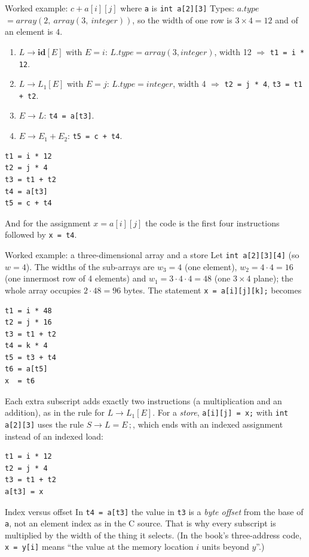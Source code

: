 \documentclass[11pt,a4paper]{article}
\newcommand{\at}[2]{\ensuremath{#1.\mathit{#2}}}
\begin{document}
\begin{examplebox}{Worked example: $c + a[i][j]$ where \texttt{a} is \texttt{int a[2][3]}}
Types: \at{a}{type} $= \mathit{array}(2,\ \mathit{array}(3,\ \mathit{integer}))$, so the width of one row is $3\times 4 = 12$ and of an element is $4$.

\begin{enumerate}[nosep]
\item $L \to \mathbf{id}[E]$ with $E = i$: $\at{L}{type}=\mathit{array}(3,\mathit{integer})$, width 12 \;$\Rightarrow$\; \texttt{t1 = i * 12}.
\item $L \to L_1[E]$ with $E = j$: $\at{L}{type}=\mathit{integer}$, width 4 \;$\Rightarrow$\; \texttt{t2 = j * 4}, \texttt{t3 = t1 + t2}.
\item $E \to L$: \texttt{t4 = a[t3]}.
\item $E \to E_1 + E_2$: \texttt{t5 = c + t4}.
\end{enumerate}
\begin{lstlisting}
t1 = i * 12
t2 = j * 4
t3 = t1 + t2
t4 = a[t3]
t5 = c + t4
\end{lstlisting}

And for the assignment $x = a[i][j]$ the code is the first four instructions followed by \texttt{x = t4}.
\end{examplebox}

\begin{examplebox}{Worked example: a three-dimensional array and a store}
Let \texttt{int a[2][3][4]} (so $w=4$). The widths of the sub-arrays are $w_3=4$ (one element), $w_2=4\cdot4=16$ (one innermost row of 4 elements) and $w_1=3\cdot4\cdot4=48$ (one $3\times4$ plane); the whole array occupies $2\cdot48=96$ bytes. The statement \texttt{x = a[i][j][k];} becomes
\begin{lstlisting}
t1 = i * 48
t2 = j * 16
t3 = t1 + t2
t4 = k * 4
t5 = t3 + t4
t6 = a[t5]
x  = t6
\end{lstlisting}
Each extra subscript adds exactly two instructions (a multiplication and an addition), as in the rule for $L\to L_1[E]$. For a \emph{store}, \texttt{a[i][j] = x;} with \texttt{int a[2][3]} uses the rule $S\to L=E\,;$, which ends with an indexed assignment instead of an indexed load:
\begin{lstlisting}
t1 = i * 12
t2 = j * 4
t3 = t1 + t2
a[t3] = x
\end{lstlisting}
\end{examplebox}

\begin{pitfallbox}{Index versus offset}
In \texttt{t4 = a[t3]} the value in \texttt{t3} is a \emph{byte offset} from the base of \texttt{a}, not an element index as in the C source. That is why every subscript is multiplied by the width of the thing it selects. (In the book's three-address code, \texttt{x = y[i]} means ``the value at the memory location $i$ units beyond $y$''.)
\end{pitfallbox}
\end{document}
